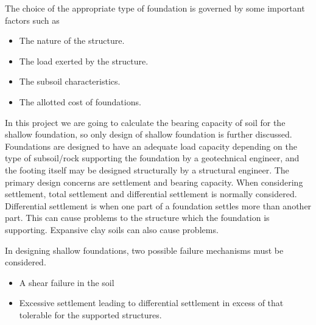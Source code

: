 The choice of the appropriate type of foundation is governed by some important factors such as
\begin{itemize}
	\item The nature of the structure.
	\item The load exerted by the structure.
	\item The subsoil characteristics.
	\item The allotted cost of foundations.
\end{itemize}

In this project we are going to calculate the bearing capacity of soil for the shallow foundation, so only design of shallow foundation is further discussed. Foundations are designed to have an adequate load capacity depending on the type of subsoil/rock supporting the foundation by a geotechnical engineer, and the footing itself may be designed structurally by a structural engineer. The primary design concerns are settlement and bearing capacity. When considering settlement, total settlement and differential settlement is normally considered. Differential settlement is when one part of a foundation settles more than another part. This can cause problems to the structure which the foundation is supporting. Expansive clay soils can also cause problems.

In designing shallow foundations, two possible failure mechanisms must be considered. \cite{dunn_fundamentals_1980}
\begin{itemize}
  \item A shear failure in the soil
  \item Excessive settlement leading to differential settlement in excess of that tolerable for the supported structures.
\end{itemize}

